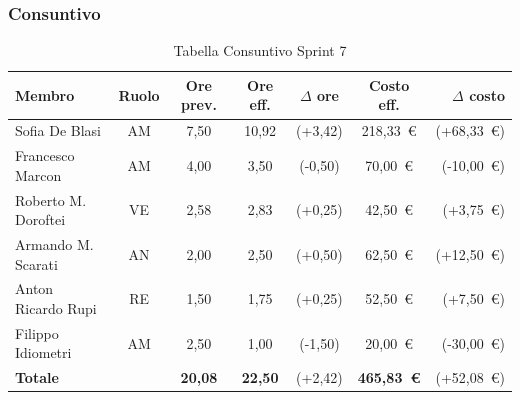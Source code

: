 \subsubsection{Consuntivo}
\begin{table}[H]
    \centering
    \renewcommand{\arraystretch}{1.3}
    \begin{tabularx}{\textwidth}{|X|c|c|c|c|c|r|}
        \hline
        \textbf{Membro} & \textbf{Ruolo} & \textbf{Ore prev.} &
        \textbf{Ore eff.} & \textbf{$\Delta$ ore} &
        \textbf{Costo eff.} & \textbf{$\Delta$ costo} \\
        \hline
        Sofia De Blasi
            & AM & 7,50 & 10,92
            & {\color{red}(+3,42)}
            & 218{,}33~\euro & {\color{red}(+68{,}33~\euro)} \\
        Francesco Marcon
            & AM & 4,00 & 3,50
            & {\color{green}(-0,50)}
            & 70{,}00~\euro & {\color{green}(-10{,}00~\euro)} \\
        Roberto M. Doroftei
            & VE & 2,58 & 2,83
            & {\color{red}(+0,25)}
            & 42{,}50~\euro & {\color{red}(+3{,}75~\euro)} \\
        Armando M. Scarati
            & AN & 2,00 & 2,50
            & {\color{red}(+0,50)}
            & 62{,}50~\euro & {\color{red}(+12{,}50~\euro)} \\
        Anton Ricardo Rupi
            & RE & 1,50 & 1,75
            & {\color{red}(+0,25)}
            & 52{,}50~\euro & {\color{red}(+7{,}50~\euro)} \\
        Filippo Idiometri
            & AM & 2,50 & 1,00
            & {\color{green}(-1,50)}
            & 20{,}00~\euro & {\color{green}(-30{,}00~\euro)} \\
        \hline
        \textbf{Totale} & & \textbf{20,08} & \textbf{22,50}
            & {\color{red}(+2,42)}
            & \textbf{465{,}83~\euro}
            & {\color{red}(+52{,}08~\euro)} \\
        \hline
    \end{tabularx}
    \caption{Tabella Consuntivo Sprint 7}
\end{table}

